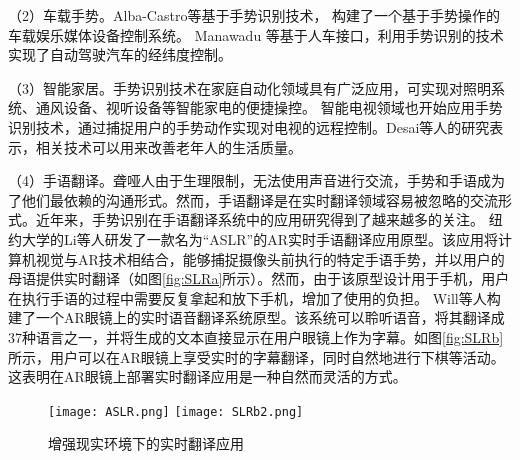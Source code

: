 （2）车载手势。Alba-Castro等基于手势识别技术， 构建了一个基于手势操作的车载娱乐媒体设备控制系统\cite{parada2014hand}。 Manawadu 等基于人车接口，利用手势识别的技术实现了自动驾驶汽车的经纬度控制\cite{manawadu2016hand}。

（3）智能家居。手势识别技术在家庭自动化领域具有广泛应用，可实现对照明系统、通风设备、视听设备等智能家电的便捷操控。
智能电视领域也开始应用手势识别技术，通过捕捉用户的手势动作实现对电视的远程控制。Desai等人的研究表示，相关技术可以用来改善老年人的生活质量\cite{desai2017human}。

（4）手语翻译。聋哑人由于生理限制，无法使用声音进行交流，手势和手语成为了他们最依赖的沟通形式。然而，手语翻译是在实时翻译领域容易被忽略的交流形式\cite{SLR1}。近年来，手势识别在手语翻译系统中的应用研究得到了越来越多的关注\cite{伍杰2019基于视觉的实时手势识别方法研究}。
纽约大学的Li等人研发了一款名为“ASLR”的AR实时手语翻译应用原型\cite{SLR1}。该应用将计算机视觉与AR技术相结合，能够捕捉摄像头前执行的特定手语手势，并以用户的母语提供实时翻译（如图\ref{fig:SLRa}所示）。然而，由于该原型设计用于手机，用户在执行手语的过程中需要反复拿起和放下手机，增加了使用的负担。
Will等人构建了一个AR眼镜上的实时语音翻译系统原型\cite{SLR2}。该系统可以聆听语音，将其翻译成37种语言之一，并将生成的文本直接显示在用户眼镜上作为字幕。如图\ref{fig:SLRb}所示，用户可以在AR眼镜上享受实时的字幕翻译，同时自然地进行下棋等活动。这表明在AR眼镜上部署实时翻译应用是一种自然而灵活的方式。

\begin{figure}
  \centering
    {\texttt{[image: ASLR.png]}}
    {\texttt{[image: SLRb2.png]}}
  \caption{增强现实环境下的实时翻译应用}
  \label{fig:SLR}
\end{figure}

